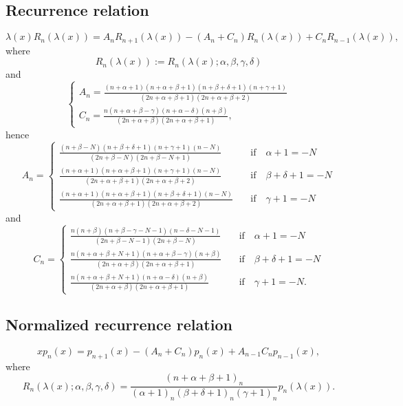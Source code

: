 \documentclass[envcountchap,graybox]{svmono}
\begin{document}
\subsection*{Recurrence relation}
\begin{equation}
\label{RecRacah}
\lambda(x)R_n(\lambda(x))
=A_nR_{n+1}(\lambda(x))-\left(A_n+C_n\right)R_n(\lambda(x))+C_nR_{n-1}(\lambda(x)),
\end{equation}
where
$$R_n(\lambda(x)):=R_n(\lambda(x);\alpha,\beta,\gamma,\delta)$$
and
$$\left\{\begin{array}{l}
\displaystyle A_n=\frac{(n+\alpha+1)(n+\alpha+\beta+1)(n+\beta+\delta+1)(n+\gamma+1)}{(2n+\alpha+\beta+1)(2n+\alpha+\beta+2)}\\[5mm]
\displaystyle C_n=\frac{n(n+\alpha+\beta-\gamma)(n+\alpha-\delta)(n+\beta)}{(2n+\alpha+\beta)(2n+\alpha+\beta+1)},
\end{array}\right.$$
hence
$$A_n=\left\{\begin{array}{ll}
\displaystyle\frac{(n+\beta-N)(n+\beta+\delta+1)(n+\gamma+1)(n-N)}{(2n+\beta-N)(2n+\beta-N+1)}&\quad\textrm{if}\quad\alpha+1=-N\\[5mm]
\displaystyle\frac{(n+\alpha+1)(n+\alpha+\beta+1)(n+\gamma+1)(n-N)}{(2n+\alpha+\beta+1)(2n+\alpha+\beta+2)}&\quad\textrm{if}\quad\beta+\delta+1=-N\\[5mm]
\displaystyle\frac{(n+\alpha+1)(n+\alpha+\beta+1)(n+\beta+\delta+1)(n-N)}{(2n+\alpha+\beta+1)(2n+\alpha+\beta+2)}&\quad\textrm{if}\quad\gamma+1=-N
\end{array}\right.$$
and
$$C_n=\left\{\begin{array}{ll}
\displaystyle\frac{n(n+\beta)(n+\beta-\gamma-N-1)(n-\delta-N-1)}{(2n+\beta-N-1)(2n+\beta-N)}&\quad\textrm{if}\quad\alpha+1=-N\\[5mm]
\displaystyle\frac{n(n+\alpha+\beta+N+1)(n+\alpha+\beta-\gamma)(n+\beta)}{(2n+\alpha+\beta)(2n+\alpha+\beta+1)}&\quad\textrm{if}\quad\beta+\delta+1=-N\\[5mm]
\displaystyle\frac{n(n+\alpha+\beta+N+1)(n+\alpha-\delta)(n+\beta)}{(2n+\alpha+\beta)(2n+\alpha+\beta+1)}&\quad\textrm{if}\quad\gamma+1=-N.
\end{array}\right.$$

\subsection*{Normalized recurrence relation}
\begin{equation}
\label{NormRecRacah}
xp_n(x)=p_{n+1}(x)-(A_n+C_n)p_n(x)+A_{n-1}C_np_{n-1}(x),
\end{equation}
where
$$R_n(\lambda(x);\alpha,\beta,\gamma,\delta)=
\frac{(n+\alpha+\beta+1)_n}{(\alpha+1)_n(\beta+\delta+1)_n(\gamma+1)_n}p_n(\lambda(x)).$$
\end{document}
